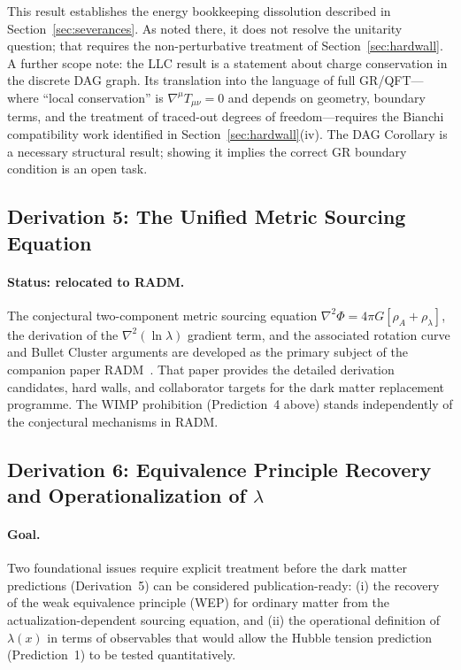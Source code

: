 \documentclass[11pt,a4paper]{article}
\theoremstyle{plain}
\theoremstyle{definition}
\theoremstyle{remark}
\begin{document}
This result establishes the energy bookkeeping dissolution described in
Section~\ref{sec:severances}. As noted there, it does not resolve the unitarity
question; that requires the non-perturbative treatment of
Section~\ref{sec:hardwall}. A further scope note: the LLC result is a statement
about charge conservation in the discrete DAG graph. Its translation into the
language of full GR/QFT---where ``local conservation'' is $\nabla^{\mu}T_{\mu\nu}
= 0$ and depends on geometry, boundary terms, and the treatment of traced-out
degrees of freedom---requires the Bianchi compatibility work identified in
Section~\ref{sec:hardwall}(iv). The DAG Corollary is a necessary structural
result; showing it implies the correct GR boundary condition is an open task.


\subsection{Derivation 5: The Unified Metric Sourcing Equation}
\label{sec:d5}

\paragraph{Status: relocated to RADM.}
The conjectural two-component metric sourcing equation
$\nabla^2\Phi = 4\pi G[\rho_A + \rho_\lambda]$, the derivation of the
$\nabla^2(\ln\lambda)$ gradient term, and the associated rotation curve and Bullet
Cluster arguments are developed as the primary subject of the companion paper
RADM~\citep{Sandeman2026RADM}. That paper provides the detailed derivation
candidates, hard walls, and collaborator targets for the dark matter replacement
programme. The WIMP prohibition (Prediction~4 above) stands independently of
the conjectural mechanisms in RADM.

\subsection{Derivation 6: Equivalence Principle Recovery and Operationalization
of $\lambda$}
\label{sec:d6}

\paragraph{Goal.}
Two foundational issues require explicit treatment before the dark matter
predictions (Derivation~5) can be considered publication-ready: (i) the recovery
of the weak equivalence principle (WEP) for ordinary matter from the
actualization-dependent sourcing equation, and (ii) the operational definition of
$\lambda(x)$ in terms of observables that would allow the Hubble tension prediction
(Prediction~1) to be tested quantitatively.
\end{document}
